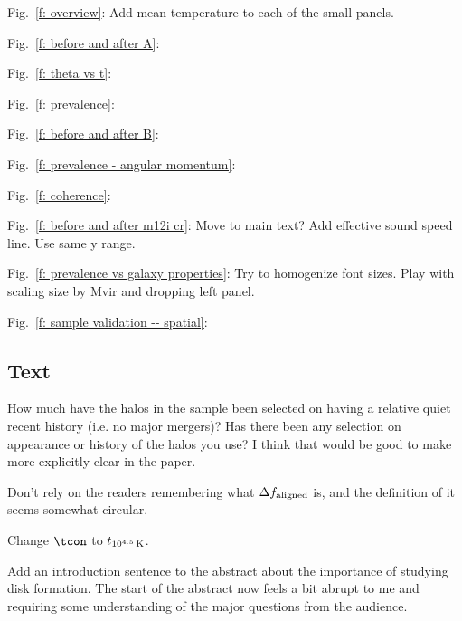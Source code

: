 Fig.~\ref{f: overview}:
Add mean temperature to each of the small panels.

Fig.~\ref{f: before and after A}:

Fig.~\ref{f: theta vs t}:

Fig.~\ref{f: prevalence}:

Fig.~\ref{f: before and after B}:

Fig.~\ref{f: prevalence - angular momentum}:

Fig.~\ref{f: coherence}:

Fig.~\ref{f: before and after m12i cr}:
Move to main text?
Add effective sound speed line.
Use same y range.

Fig.~\ref{f: prevalence vs galaxy properties}:
Try to homogenize font sizes.
Play with scaling size by Mvir and dropping left panel.

Fig.~\ref{f: sample validation -- spatial}:

\subsection{Text}

How much have the halos in the sample been selected on having a relative quiet recent history (i.e. no major mergers)? Has there been any selection on appearance or history of the halos you use? I think that would be good to make more explicitly clear in the paper. 

Don't rely on the readers remembering what $\Delta f_{\rm aligned}$ is, and the definition of it seems somewhat circular.

Change $\tcon$ to $t_{10^{4.5}\,{\rm K}}$.

Add an introduction sentence to the abstract about the importance of studying disk formation.
The start of the abstract now feels a bit abrupt to me and requiring some understanding of the major questions from the audience.

